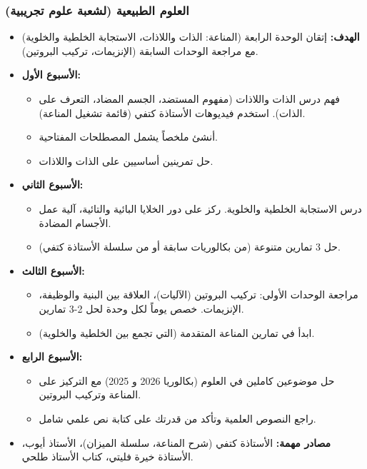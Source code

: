 \documentclass[12pt,a4paper]{book}
\begin{document}
	\subsubsection*{العلوم الطبيعية (لشعبة علوم تجريبية)}
	\begin{itemize}
		\item \textbf{الهدف:} إتقان الوحدة الرابعة (المناعة: الذات واللاذات، الاستجابة الخلطية والخلوية) مع مراجعة الوحدات السابقة (الإنزيمات، تركيب البروتين).
		\item \textbf{الأسبوع الأول:}
		\begin{itemize}
			\item فهم درس الذات واللاذات (مفهوم المستضد، الجسم المضاد، التعرف على الذات). استخدم فيديوهات الأستاذة كتفي (قائمة تشغيل المناعة).
			\item أنشئ ملخصاً يشمل المصطلحات المفتاحية.
			\item حل تمرينين أساسيين على الذات واللاذات.
		\end{itemize}
		\item \textbf{الأسبوع الثاني:}
		\begin{itemize}
			\item درس الاستجابة الخلطية والخلوية. ركز على دور الخلايا البائية والتائية، آلية عمل الأجسام المضادة.
			\item حل 3 تمارين متنوعة (من بكالوريات سابقة أو من سلسلة الأستاذة كتفي).
		\end{itemize}
		\item \textbf{الأسبوع الثالث:}
		\begin{itemize}
			\item مراجعة الوحدات الأولى: تركيب البروتين (الآليات)، العلاقة بين البنية والوظيفة، الإنزيمات. خصص يوماً لكل وحدة لحل 2-3 تمارين.
			\item ابدأ في تمارين المناعة المتقدمة (التي تجمع بين الخلطية والخلوية).
		\end{itemize}
		\item \textbf{الأسبوع الرابع:}
		\begin{itemize}
			\item حل موضوعين كاملين في العلوم (بكالوريا 2026 و 2025) مع التركيز على المناعة وتركيب البروتين.
			\item راجع النصوص العلمية وتأكد من قدرتك على كتابة نص علمي شامل.
		\end{itemize}
		\item \textbf{مصادر مهمة:} الأستاذة كتفي (شرح المناعة، سلسلة الميزان)، الأستاذ أيوب، الأستاذة خيرة فليتي، كتاب الأستاذ طلحي.
	\end{itemize}
	
\end{document}

